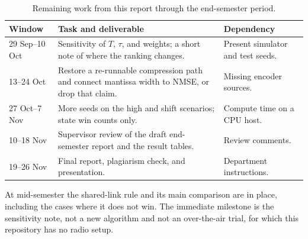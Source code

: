 \documentclass[11pt,a4paper]{article}
\begin{document}
\begin{table}[h]
\centering
\caption{Remaining work from this report through the end-semester period.}
\label{tab:plan}
\small
\setlength{\tabcolsep}{3.5pt}
\begin{tabular}{@{}p{2.5cm}p{5.4cm}p{6.6cm}@{}}
\toprule
Window & Task and deliverable & Dependency \\
\midrule
29 Sep--10 Oct &
Sensitivity of \(T\), \(\tau\), and weights; a short note of where the ranking changes. &
Present simulator and test seeds. \\
13--24 Oct &
Restore a re-runnable compression path and connect mantissa width to NMSE, or drop that claim. &
Missing encoder sources. \\
27 Oct--7 Nov &
More seeds on the high and shift scenarios; state win counts only. &
Compute time on a CPU host. \\
10--18 Nov &
Supervisor review of the draft end-semester report and the result tables. &
Review comments. \\
19--26 Nov &
Final report, plagiarism check, and presentation. &
Department instructions. \\
\bottomrule
\end{tabular}
\end{table}

At mid-semester the shared-link rule and its main comparison are in place, including the cases where it does not win. The immediate milestone is the sensitivity note, not a new algorithm and not an over-the-air trial, for which this repository has no radio setup.
\end{document}
